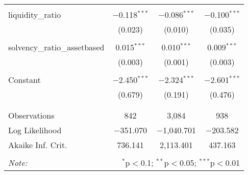 \begin{table}[!htbp]
\begin{tabular}{@{\extracolsep{5pt}}lccc}
  & & & \\ 
 liquidity\_ratio & $-$0.118$^{***}$ & $-$0.086$^{***}$ & $-$0.100$^{***}$ \\ 
  & (0.023) & (0.010) & (0.035) \\ 
  & & & \\ 
 solvency\_ratio\_assetbased & 0.015$^{***}$ & 0.010$^{***}$ & 0.009$^{***}$ \\ 
  & (0.003) & (0.001) & (0.003) \\ 
  & & & \\ 
 Constant & $-$2.450$^{***}$ & $-$2.324$^{***}$ & $-$2.601$^{***}$ \\ 
  & (0.679) & (0.191) & (0.476) \\ 
  & & & \\ 
\hline \\[-1.8ex] 
Observations & 842 & 3,084 & 938 \\ 
Log Likelihood & $-$351.070 & $-$1,040.701 & $-$203.582 \\ 
Akaike Inf. Crit. & 736.141 & 2,113.401 & 437.163 \\ 
\hline 
\hline \\[-1.8ex] 
\textit{Note:}  & \multicolumn{3}{r}{$^{*}$p$<$0.1; $^{**}$p$<$0.05; $^{***}$p$<$0.01} \\ 
\end{tabular} 
\end{table} 